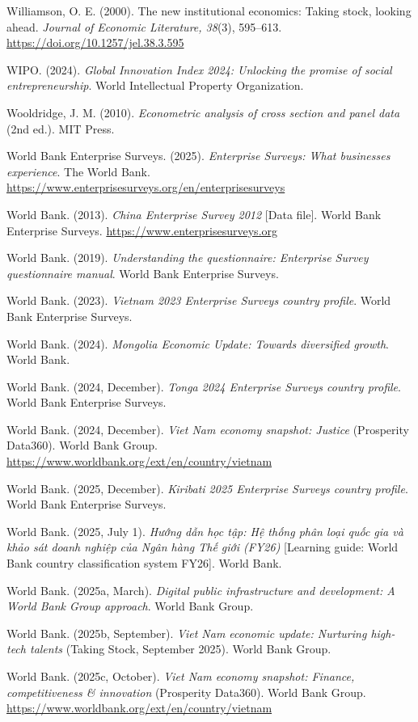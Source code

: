 \documentclass[
  a4paper,
  13pt]{extreport}
\begin{document}
Williamson, O. E. (2000). The new institutional economics: Taking stock,
looking ahead. \emph{Journal of Economic Literature, 38}(3), 595--613.
\url{https://doi.org/10.1257/jel.38.3.595}

WIPO. (2024). \emph{Global Innovation Index 2024: Unlocking the promise
of social entrepreneurship}. World Intellectual Property Organization.

Wooldridge, J. M. (2010). \emph{Econometric analysis of cross section
and panel data} (2nd ed.). MIT Press.

World Bank Enterprise Surveys. (2025). \emph{Enterprise Surveys: What
businesses experience}. The World Bank.
\url{https://www.enterprisesurveys.org/en/enterprisesurveys}

World Bank. (2013). \emph{China Enterprise Survey 2012} {[}Data file{]}.
World Bank Enterprise Surveys. \url{https://www.enterprisesurveys.org}

World Bank. (2019). \emph{Understanding the questionnaire: Enterprise
Survey questionnaire manual}. World Bank Enterprise Surveys.

World Bank. (2023). \emph{Vietnam 2023 Enterprise Surveys country
profile}. World Bank Enterprise Surveys.

World Bank. (2024). \emph{Mongolia Economic Update: Towards diversified
growth}. World Bank.

World Bank. (2024, December). \emph{Tonga 2024 Enterprise Surveys
country profile}. World Bank Enterprise Surveys.

World Bank. (2024, December). \emph{Viet Nam economy snapshot: Justice}
(Prosperity Data360). World Bank Group.
\url{https://www.worldbank.org/ext/en/country/vietnam}

World Bank. (2025, December). \emph{Kiribati 2025 Enterprise Surveys
country profile}. World Bank Enterprise Surveys.

World Bank. (2025, July 1). \emph{Hướng dẫn học tập: Hệ thống phân loại
quốc gia và khảo sát doanh nghiệp của Ngân hàng Thế giới (FY26)}
{[}Learning guide: World Bank country classification system FY26{]}.
World Bank.

World Bank. (2025a, March). \emph{Digital public infrastructure and
development: A World Bank Group approach}. World Bank Group.

World Bank. (2025b, September). \emph{Viet Nam economic update:
Nurturing high-tech talents} (Taking Stock, September 2025). World Bank
Group.

World Bank. (2025c, October). \emph{Viet Nam economy snapshot: Finance,
competitiveness \& innovation} (Prosperity Data360). World Bank Group.
\url{https://www.worldbank.org/ext/en/country/vietnam}
\end{document}
